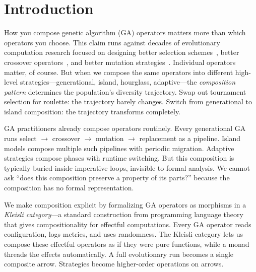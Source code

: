 \documentclass[sigconf,anonymous]{acmart}
\begin{document}


\maketitle

\section{Introduction}

How you compose genetic algorithm (GA) operators matters more than which operators you choose. This claim runs against decades of evolutionary computation research focused on designing better selection schemes~\cite{blickle1996comparison}, better crossover operators~\cite{eshelman1993crossover}, and better mutation strategies~\cite{back1996evolutionary}. Individual operators matter, of course. But when we compose the same operators into different high-level strategies---generational, island, hourglass, adaptive---the \emph{composition pattern} determines the population's diversity trajectory. Swap out tournament selection for roulette: the trajectory barely changes. Switch from generational to island composition: the trajectory transforms completely.

GA practitioners already compose operators routinely. Every generational GA runs select $\to$ crossover $\to$ mutation $\to$ replacement as a pipeline. Island models compose multiple such pipelines with periodic migration. Adaptive strategies compose phases with runtime switching. But this composition is typically buried inside imperative loops, invisible to formal analysis. We cannot ask ``does this composition preserve a property of its parts?'' because the composition has no formal representation.

We make composition explicit by formalizing GA operators as morphisms in a \emph{Kleisli category}---a standard construction from programming language theory~\cite{moggi1991notions} that gives compositionality for effectful computations. Every GA operator reads configuration, logs metrics, and uses randomness. The Kleisli category lets us compose these effectful operators as if they were pure functions, while a monad threads the effects automatically. A full evolutionary run becomes a single composite arrow. Strategies become higher-order operations on arrows.
\end{document}
